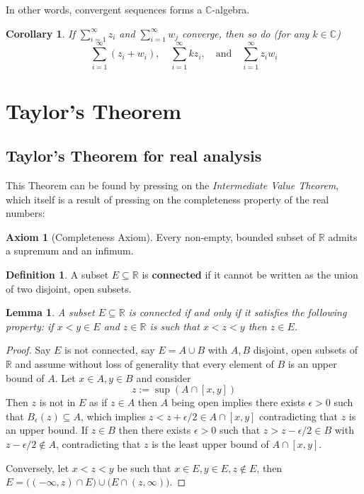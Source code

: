 \documentclass[12pt]{article}
\theoremstyle{plain}
\newtheorem{lemma}[thm]{Lemma}
\newtheorem{cor}[thm]{Corollary}
\theoremstyle{definition}
\newtheorem{defn}[thm]{Definition} %
\newtheorem{axiom}[thm]{Axiom}
\newcommand{\bb}[1]{\mathbb{#1}}
\begin{document}
In other words, convergent sequences forms a $\bb{C}$-algebra.
\begin{cor}\label{cor:sum_convergen_sums}
If $\sum_{i = 1}^\infty z_i$ and $\sum_{i = 1}^\infty w_j$ converge, then so do (for any $k \in \bb{C}$)
\begin{equation}
\sum_{i = 1}^\infty (z_i + w_i),\quad\sum_{i = 1}^\infty kz_i,\quad \text{and}\quad \sum_{i = 1}^\infty z_iw_i
\end{equation}
\end{cor}


\section{Taylor's Theorem}
\subsection{Taylor's Theorem for real analysis}
This Theorem can be found by pressing on the \emph{Intermediate Value Theorem}, which itself is a result of pressing on the completeness property of the real numbers:
\begin{axiom}[Completeness Axiom]
Every non-empty, bounded subset of $\bb{R}$ admits a supremum and an infimum.
\end{axiom}
\begin{defn}
A subset $E \subseteq \bb{R}$ is \textbf{connected} if it cannot be written as the union of two disjoint, open subsets.
\end{defn}
\begin{lemma}
\label{lem:connectedness}
A subset $E \subseteq \bb{R}$ is connected if and only if it satisfies the following property: if $x < y \in E$ and $z \in \bb{R}$ is such that $x < z < y$ then $z \in E$.
\end{lemma}
\begin{proof}
Say $E$ is not connected, say $E = A \cup B$ with $A,B$ disjoint, open subsets of $\bb{R}$ and assume without loss of generality that every element of $B$ is an upper bound of $A$. Let $x \in A, y \in B$ and consider
\[z := \sup (A \cap [x,y])\]
Then $z$ is not in $E$ as if $z \in A$ then $A$ being open implies there exists $\epsilon > 0$ such that $B_\epsilon(z) \subseteq A$, which implies $z < z + \epsilon/2 \in A \cap [x,y]$ contradicting that $z$ is an upper bound. If $z \in B$ then there exists $\epsilon > 0$ such that $z > z - \epsilon/2 \in B$ with $z - \epsilon/2 \not\in A$, contradicting that $z$ is the least upper bound of $A \cap [x,y]$.

Conversely, let $x < z < y$ be such that $x \in E, y \in E, z \not\in E$, then $E = \big((-\infty, z) \cap E\big) \cup \big(E \cap (z,\infty)\big)$.
\end{proof}
\end{document}
